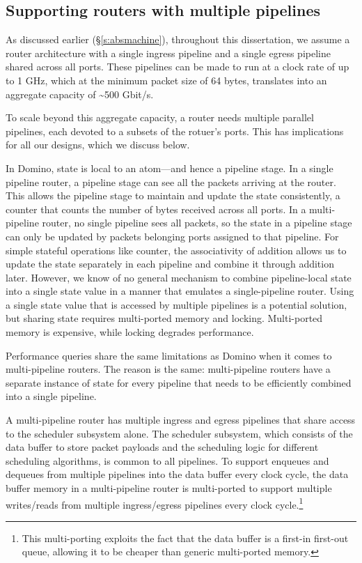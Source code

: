 \subsection{Supporting routers with multiple pipelines}
\label{ss:multiple}

As discussed earlier (\S\ref{s:absmachine}), throughout this dissertation, we
assume a router architecture with a single ingress pipeline and a single egress
pipeline shared across all ports. These pipelines can be made to run at a clock
rate of up to 1 GHz, which at the minimum packet size of 64 bytes, translates
into an aggregate capacity of \textasciitilde500 Gbit/s.

To scale beyond this aggregate capacity, a router needs multiple parallel
pipelines, each devoted to a subsets of the rotuer's ports. This has
implications for all our designs, which we discuss below.

 In Domino, state is local to an atom---and hence a pipeline
stage.  In a single pipeline router, a pipeline stage can see all the packets
arriving at the router. This allows the pipeline stage to maintain and update
the state consistently, \eg a counter that counts the number of bytes received
across all ports. In a multi-pipeline router, no single pipeline sees all
packets, so the state in a pipeline stage can only be updated by packets
belonging ports assigned to that pipeline. For simple stateful operations like
counter, the associativity of addition allows us to update the state separately
in each pipeline and combine it through addition later. However, we know of no
general mechanism to combine pipeline-local state into a single state value in
a manner that emulates a single-pipeline router. Using a single state value
that is accessed by multiple pipelines is a potential solution, but sharing
state requires multi-ported memory and locking. Multi-ported memory is
expensive, while locking degrades performance.

 Performance queries share the same limitations as
Domino when it comes to multi-pipeline routers. The reason is the same:
multi-pipeline routers have a separate instance of state for every pipeline
that needs to be efficiently combined into a single pipeline.

 A multi-pipeline router has multiple ingress and egress pipelines
that share access to the scheduler subsystem alone. The scheduler subsystem,
which consists of the data buffer to store packet payloads and the scheduling
logic for different scheduling algorithms, is common to all pipelines. To
support enqueues and dequeues from multiple pipelines into the data buffer
every clock cycle, the data buffer memory in a multi-pipeline router is
multi-ported to support multiple writes/reads from multiple ingress/egress
pipelines every clock cycle.\footnote{This multi-porting exploits the fact that
the data buffer is a first-in first-out queue, allowing it to be cheaper than
generic multi-ported memory.}

